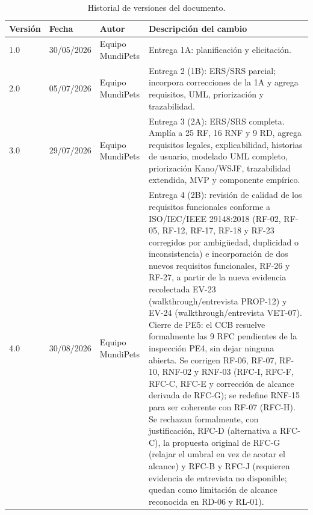 \documentclass[journal,onecolumn]{IEEEtran}
\begin{document}
	\begin{table}[H]
		\centering
		\caption{Historial de versiones del documento.}
		\label{tab:historial}
		\small
		\begin{tabularx}{\textwidth}{@{}l l l X@{}}
			\toprule
			\textbf{Versión} & \textbf{Fecha} & \textbf{Autor} & \textbf{Descripción del cambio} \\
			\midrule
			1.0 & 30/05/2026 & Equipo MundiPets & Entrega 1A: planificación y elicitación. \\
			2.0 & 05/07/2026 & Equipo MundiPets & Entrega 2 (1B): ERS/SRS parcial; incorpora correcciones de la 1A y agrega requisitos, UML, priorización y trazabilidad. \\
			3.0 & 29/07/2026 & Equipo MundiPets & Entrega 3 (2A): ERS/SRS completa. Amplía a 25 RF, 16 RNF y 9 RD, agrega requisitos legales, explicabilidad, historias de usuario, modelado UML completo, priorización Kano/WSJF, trazabilidad extendida, MVP y componente empírico. \\
			4.0 & 30/08/2026 & Equipo MundiPets & Entrega 4 (2B): revisión de calidad de los requisitos funcionales conforme a ISO/IEC/IEEE 29148:2018 (RF-02, RF-05, RF-12, RF-17, RF-18 y RF-23 corregidos por ambigüedad, duplicidad o inconsistencia) e incorporación de dos nuevos requisitos funcionales, RF-26 y RF-27, a partir de la nueva evidencia recolectada EV-23 (walkthrough/entrevista PROP-12) y EV-24 (walkthrough/entrevista VET-07). Cierre de PE5: el CCB resuelve formalmente las 9 RFC pendientes de la inspección PE4, sin dejar ninguna abierta. Se corrigen RF-06, RF-07, RF-10, RNF-02 y RNF-03 (RFC-I, RFC-F, RFC-C, RFC-E y corrección de alcance derivada de RFC-G); se redefine RNF-15 para ser coherente con RF-07 (RFC-H). Se rechazan formalmente, con justificación, RFC-D (alternativa a RFC-C), la propuesta original de RFC-G (relajar el umbral en vez de acotar el alcance) y RFC-B y RFC-J (requieren evidencia de entrevista no disponible; quedan como limitación de alcance reconocida en RD-06 y RL-01). \\
			\bottomrule
		\end{tabularx}
	\end{table}
	
	\newpage
	\tableofcontents
	\newpage
	\listoffigures
	\listoftables
	\lstlistoflistings
	\newpage
	
\end{document}
